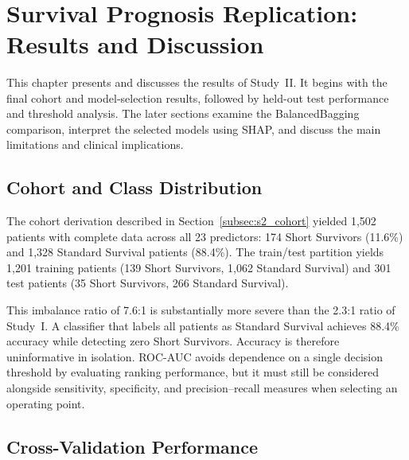 ﻿﻿\chapter{Survival Prognosis Replication: Results and Discussion}
\label{ch:study2_results}

This chapter presents and discusses the results of Study~II. It begins with the final cohort and model-selection results, followed by held-out test performance and threshold analysis. The later sections examine the BalancedBagging comparison, interpret the selected models using SHAP, and discuss the main limitations and clinical implications.

\section{Cohort and Class Distribution}
\label{sec:s2r_cohort}

The cohort derivation described in Section~\ref{subsec:s2_cohort} yielded 1,502 patients with complete data across all 23 predictors: 174 Short Survivors (11.6\%) and 1,328 Standard Survival patients (88.4\%).
The train/test partition yields 1,201 training patients (139 Short Survivors, 1,062 Standard Survival) and 301 test patients (35 Short Survivors, 266 Standard Survival).

This imbalance ratio of 7.6:1 is substantially more severe than the 2.3:1 ratio of Study~I.
A classifier that labels all patients as Standard Survival achieves 88.4\% accuracy while detecting zero Short Survivors.
Accuracy is therefore uninformative in isolation. ROC-AUC avoids dependence on a single decision threshold by evaluating ranking performance, but it must still be considered alongside sensitivity, specificity, and precision--recall measures when selecting an operating point.

\section{Cross-Validation Performance}
\label{sec:s2r_cv}

